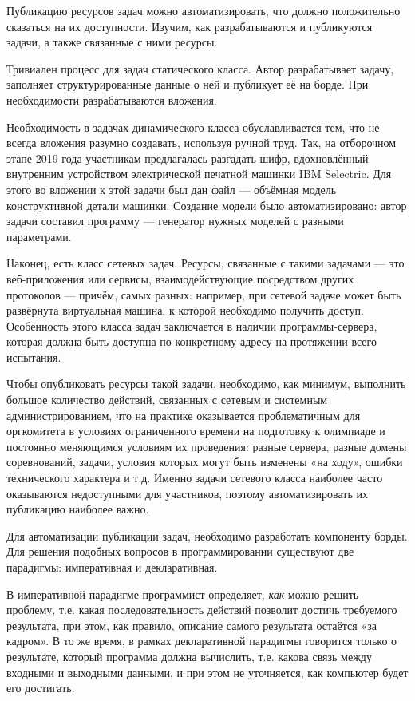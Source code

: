 Публикацию ресурсов задач можно автоматизировать, что должно положительно сказаться на их доступности. Изучим, как разрабатываются и публикуются задачи, а также связанные с ними ресурсы.

\FloatBarrier

Тривиален процесс для задач статического класса. Автор разрабатывает задачу, заполняет структурированные данные о ней и публикует её на борде. При необходимости разрабатываются вложения.

Необходимость в задачах динамического класса обуславливается тем, что не всегда вложения разумно создавать, используя ручной труд. Так, на отборочном этапе 2019 года участникам предлагалась разгадать шифр, вдохновлённый внутренним устройством электрической печатной машинки IBM Selectric\cite{Selectric}. Для этого во вложении к этой задачи был дан файл --- объёмная модель конструктивной детали машинки. Создание модели было автоматизировано: автор задачи составил программу — генератор нужных моделей с разными параметрами.


Наконец, есть класс сетевых задач. Ресурсы, связанные с такими задачами — это веб-приложения или сервисы, взаимодействующие посредством других протоколов — причём, самых разных: например, при сетевой задаче может быть развёрнута виртуальная машина, к которой необходимо получить доступ. Особенность этого класса задач заключается в наличии программы-сервера, которая должна быть доступна по конкретному адресу на протяжении всего испытания.

Чтобы опубликовать ресурсы такой задачи, необходимо, как минимум, выполнить большое количество действий, связанных с сетевым и системным администрированием, что на практике оказывается проблематичным для оргкомитета в условиях ограниченного времени на подготовку к олимпиаде и постоянно меняющимся условиям их проведения: разные сервера, разные домены соревнований, задачи, условия которых могут быть изменены «на ходу», ошибки технического характера и т.д. Именно задачи сетевого класса наиболее часто оказываются недоступными для участников, поэтому автоматизировать их публикацию наиболее важно.

Для автоматизации публикации задач, необходимо разработать компоненту борды. Для решения подобных вопросов в программировании существуют две парадигмы: императивная и декларативная\cite{Cioni88}.

В императивной парадигме программист определяет, \textit{как} можно решить проблему, т.е. какая последовательность действий позволит достичь требуемого результата, при этом, как правило, описание самого результата остаётся «за кадром». В то же время, в рамках декларативной парадигмы говорится только о результате, который программа должна вычислить, т.е. какова связь между входными и выходными данными, и при этом не уточняется, как компьютер будет его достигать.

